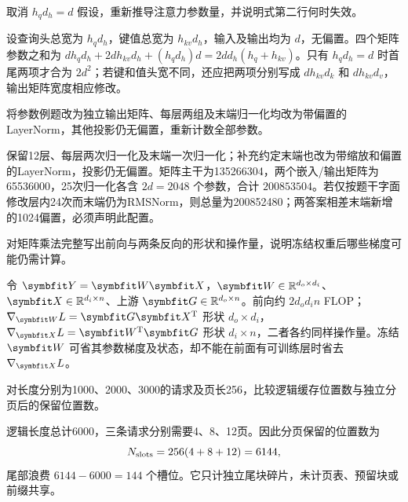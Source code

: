 
\begin{exercises}
\begin{exercise}\optional 取消 $h_qd_h=d$ 假设，重新推导注意力参数量，并说明式第二行何时失效。

\begin{solution}
设查询头总宽为 $h_qd_h$，键值总宽为 $h_{kv}d_h$，输入及输出均为 $d$，无偏置。四个矩阵参数之和为 $dh_qd_h+2dh_{kv}d_h+(h_qd_h)d=2dd_h(h_q+h_{kv})$。只有 $h_qd_h=d$ 时首尾两项才合为 $2d^2$；若键和值头宽不同，还应把两项分别写成 $dh_{kv}d_k$ 和 $dh_{kv}d_v$，输出矩阵宽度相应修改。
\end{solution}
\end{exercise}

\begin{exercise} 将参数例题改为独立输出矩阵、每层两组及末端归一化均改为带偏置的 LayerNorm，其他投影仍无偏置，重新计数全部参数。

\begin{solution}
保留12层、每层两次归一化及末端一次归一化；补充约定末端也改为带缩放和偏置的LayerNorm，投影仍无偏置。矩阵主干为135266304，两个嵌入/输出矩阵为65536000，25次归一化各含 $2d=2048$ 个参数，合计 $200853504$。若仅按题干字面修改层内24次而末端仍为RMSNorm，则总量为200852480；两答案相差末端新增的1024偏置，必须声明此配置。
\end{solution}
\end{exercise}

\begin{exercise} 对矩阵乘法完整写出前向与两条反向的形状和操作量，说明冻结权重后哪些梯度可能仍需计算。

\begin{solution}
令 $\mat{Y}=\mat{W}\mat{X}$，$\mat{W}\in\mathbb R^{d_o\times d_i}$、$\mat{X}\in\mathbb R^{d_i\times n}$、上游 $\mat{G}\in\mathbb R^{d_o\times n}$。前向约 $2d_od_in$ FLOP；$\nabla_{\mat{W}}L=\mat{G}\mat{X}^{\mathrm{T}}$ 形状 $d_o\times d_i$，$\nabla_{\mat{X}}L=\mat{W}^{\mathrm{T}}\mat{G}$ 形状 $d_i\times n$，二者各约同样操作量。冻结 $\mat{W}$ 可省其参数梯度及状态，却不能在前面有可训练层时省去 $\nabla_{\mat{X}}L$。
\end{solution}
\end{exercise}

\begin{exercise} 对长度分别为1000、2000、3000的请求及页长256，比较逻辑缓存位置数与独立分页后的保留位置数。

\begin{solution}
逻辑长度总计6000，三条请求分别需要4、8、12页。因此分页保留的位置数为
\[
 N_{\rm slots}=256(4+8+12)=6144,
\]
尾部浪费 $6144-6000=144$ 个槽位。它只计独立尾块碎片，未计页表、预留块或前缀共享。
\end{solution}
\end{exercise}


\end{exercises}

